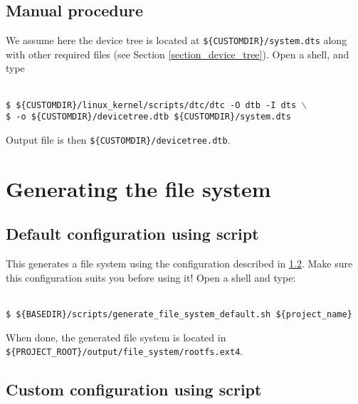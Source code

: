 \documentclass[openany,a4paper]{book}
\begin{document}
\subsection{Manual procedure}

We assume here the device tree is located at \nolinkurl{${CUSTOMDIR}/system.dts} along with other required files (see Section \ref{section_device_tree}).
Open a shell, and type

\begin{tabbing}
\kill \hspace{1cm} \= \\
\> \texttt{\$ \$\{CUSTOMDIR\}/linux\_kernel/scripts/dtc/dtc -O dtb -I dts $\backslash$}\\
\> \texttt{\$ -o \$\{CUSTOMDIR\}/devicetree.dtb \$\{CUSTOMDIR\}/system.dts}\\
\end{tabbing}

Output file is then \nolinkurl{${CUSTOMDIR}/devicetree.dtb}.


\section{Generating the file system}

\subsection{Default configuration using script}

This generates a file system using the configuration described in \ref{section_manual_file_system}.
Make sure this configuration suits you before using it!
Open a shell and type:

\begin{tabbing}
\kill \hspace{1cm} \= \\
\> \texttt{\$ \$\{BASEDIR\}/scripts/generate\_file\_system\_default.sh \$\{project\_name\}}\\
\end{tabbing}

When done, the generated file system is located in \nolinkurl{${PROJECT_ROOT}/output/file_system/rootfs.ext4}.

\subsection{Custom configuration using script}\label{section_manual_file_system}
\end{document}
